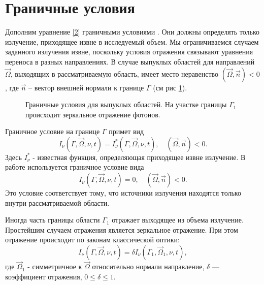 \section {Граничные условия}
Дополним уравнение \eqref{2} граничными условиями \cite{chetv_1985}. Они должны определять только излучение, приходящее извне в исследуемый объем. Мы ограничиваемся случаем заданного излучения извне, поскольку условия отражения связывают уравнения переноса в разных направлениях. В случае выпуклых областей для направлений $\vec\Omega$, выходящих в рассматриваемую область, имеет место неравенство $(\vec\Omega, \vec n) < 0$, где $\vec n$ -- вектор внешней нормали к границе $\Gamma$ (см рис \ref{fig:6}).
\begin{figure}[ht!]
	\caption{Граничные условия для выпуклых областей. На участке границы $\Gamma_1$ происходит зеркальное отражение фотонов.}
	\label{fig:6}
\end{figure}

Граничное условие на границе $\Gamma$ примет вид
\begin {equation}
I_\nu (\Gamma, \vec\Omega, \nu, t) = I_\nu^*(\Gamma, \vec\Omega, \nu, t), \quad (\vec\Omega, \vec n) < 0.
\end {equation}
Здесь $I_\nu^*$ - известная функция, определяющая приходящее извне излучение. В работе используется граничное условие вида
\begin {equation}
I_\nu (\Gamma, \vec\Omega, \nu, t) = 0, \quad (\vec\Omega, \vec n) < 0.
\end {equation}
Это условие соответствует тому, что источники излучения находятся только внутри рассматриваемой области.

Иногда часть границы области $\Gamma_1$ отражает выходящее из объема излучение. Простейшим случаем отражения является зеркальное отражение. При этом отражение происходит по законам классической оптики:
\begin {equation}
I_\nu (\Gamma, \vec\Omega, \nu, t) = \delta I_\nu(\Gamma_1, \vec\Omega_1, \nu, t), 
\end {equation}
где $\vec\Omega_1$ - симметричное к $\vec\Omega$ относительно нормали направление, $\delta$ --- коэффициент отражения, $0 \leqslant \delta \leqslant 1$.
